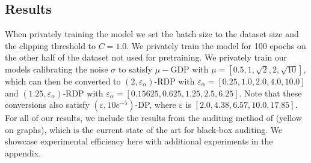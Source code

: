 \documentclass{article}
\theoremstyle{plain}
\theoremstyle{definition}
\theoremstyle{remark}
\begin{document}
\subsection{Results}
When privately training the model we set the batch size to the dataset size and the clipping threshold to $C =1.0$. We privately train the model for 100 epochs on the other half of the dataset not used for pretraining. We privately train our models calibrating the noise $\sigma$ to satisfy $\mu-$GDP with $\mu = [0.5, 1, \sqrt 2, 2, \sqrt {10}]$, which can then be converted to $(2, \varepsilon_\alpha)$-RDP with $\varepsilon_\alpha = [0.25, 1.0, 2.0, 4.0, 10.0]$ and $(1.25, \varepsilon_\alpha)$-RDP with $\varepsilon_\alpha = [0.15625, 0.625, 1.25, 2.5, 6.25]$. Note that these conversions also satisfy $(\varepsilon, 10e^{-5})$-DP, where $\varepsilon$ is $[2.0, 4.38, 6.57, 10.0, 17.85]$. For all of our results, we include the results from the auditing method of \cite{muthu2024nearly} (yellow on graphs), which is the current state of the art for black-box auditing. We showcase experimental efficiency here with additional experiments in the appendix. 


\end{document}
